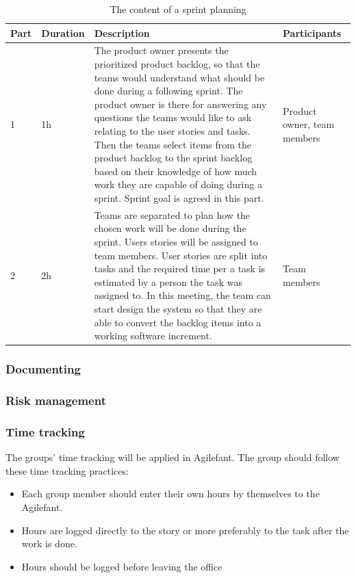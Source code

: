 \begin{table}[H]
\center
\begin{tabular}{|p{1cm}|p{2cm}|p{5cm}|p{4cm}|} 
	
\hline 
\textbf{Part} & \textbf{Duration} & \textbf{Description} & 
\textbf{Participants} \\ 
\hline
1 & 1h & The product owner presents the prioritized product backlog, so that 
the teams would understand what should be done during a following sprint. The 
product owner is there for answering any questions the teams would like to ask 
relating to the user stories and tasks. Then the teams select items from the 
product backlog to the sprint backlog based on their knowledge of how much work 
they are capable of doing during a sprint. Sprint goal is agreed in this part. 
& Product owner, team members \\
\hline
2 & 2h & Teams are separated to plan how the chosen work will be done during 
the sprint. Users stories will be assigned to team members. User stories are 
split into tasks and the required time per a task is estimated by a person the 
task was assigned to. In this meeting, the team can start design the system so 
that they are able to convert the backlog items into a working software 
increment. & Team members \\
\hline
\end{tabular} 
\caption{The content of a sprint planning}
\label{table:Sprintplanning}
\end{table}

\subsubsection{Documenting}

\subsubsection{Risk management}

\subsubsection{Time tracking}

The groups' time tracking will be applied in Agilefant. The group should follow these time tracking practices:
\begin{itemize}
\item Each group member should enter their own hours by themselves to the Agilefant.
\item Hours are logged directly to the story or more preferably to the task after the work is done. 
\item Hours should be logged before leaving the office
\end{itemize}


